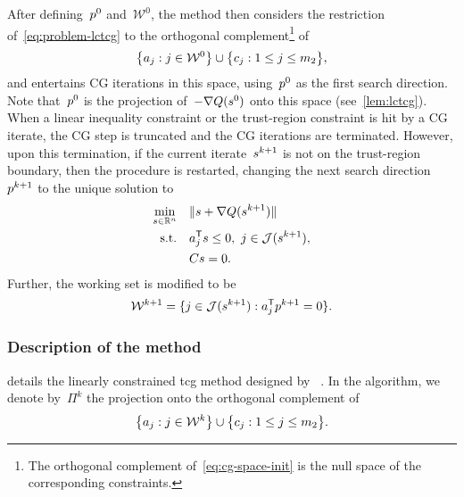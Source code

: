 After defining~$\pstep[0]$ and~$\mathcal{W}^0$, the method then considers the restriction of~\cref{eq:problem-lctcg} to the orthogonal complement\footnote{The orthogonal complement of~\cref{eq:cg-space-init} is the null space of the corresponding constraints.} of
\begin{equation}
    \label{eq:cg-space-init}
    \set[\big]{a_j : j \in \mathcal{W}^0} \cup \set[\big]{c_j : 1 \le j \le m_2},
\end{equation}
and entertains CG iterations in this space, using~$\pstep[0]$ as the first search direction.
Note that~$\pstep[0]$ is the projection of~$-\nabla Q(\sstep[0])$ onto this space (see~\cref{lem:lctcg}).
When a linear inequality constraint or the trust-region constraint is hit by a CG iterate, the CG
step is truncated and the CG iterations are terminated.
However, upon this termination, if the current iterate~$\sstep[k + 1]$ is not on the trust-region boundary, then the procedure is restarted, changing the next search direction~$\pstep[k + 1]$ to the unique solution to
\begin{subequations}
    \label{eq:tcg-linear-working-set-after}
    \begin{align}
        \min_{\sstep \in \R^n}  & \quad \norm{\sstep + \nabla Q(\sstep[k + 1])}\\
        \text{s.t.}             & \quad a_j^{\T} \sstep \le 0, ~ j \in \mathcal{J}(\sstep[k + 1]),\\
                                & \quad C \sstep = 0.
    \end{align}
\end{subequations}
Further, the working set is modified to be
\begin{equation}
    \label{eq:tcg-linear-working-set-restart}
    \mathcal{W}^{k + 1} = \set{j \in \mathcal{J}(\sstep[k + 1]) : a_j^{\T} \pstep[k + 1] = 0}.
\end{equation}

\subsubsection{Description of the  method}

 details the linearly constrained \gls{tcg} method designed by \citeauthor{Powell_2015}~\cite{Powell_2015}.
In the algorithm, we denote by~$\Pi^k$ the projection onto the orthogonal complement of
\begin{equation*}
    \set[\big]{a_j : j \in \mathcal{W}^k} \cup \set[\big]{c_j : 1 \le j \le m_2}.
\end{equation*}

